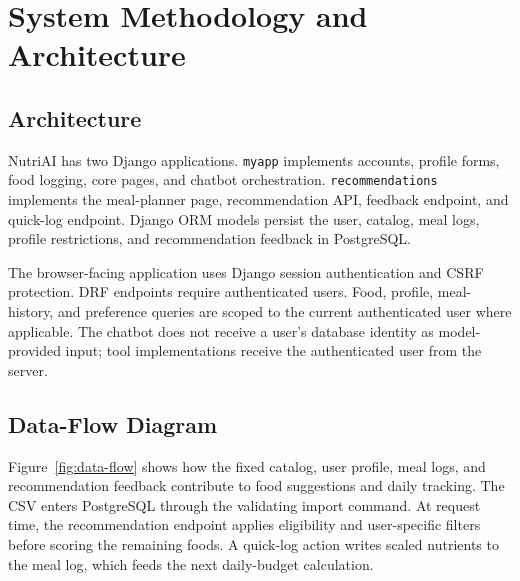 \documentclass[12pt,a4paper]{report}
\begin{document}
\chapter{System Methodology and Architecture}
\section{Architecture}
NutriAI has two Django applications. \texttt{myapp} implements accounts, profile forms,
food logging, core pages, and chatbot orchestration. \texttt{recommendations} implements
the meal-planner page, recommendation API, feedback endpoint, and quick-log endpoint.
Django ORM models persist the user, catalog, meal logs, profile restrictions, and
recommendation feedback in PostgreSQL.

\begin{center}
\end{center}

The browser-facing application uses Django session authentication and CSRF protection.
DRF endpoints require authenticated users. Food, profile, meal-history, and preference
queries are scoped to the current authenticated user where applicable. The chatbot does
not receive a user's database identity as model-provided input; tool implementations
receive the authenticated user from the server.

\section{Data-Flow Diagram}
Figure~\ref{fig:data-flow} shows how the fixed catalog, user profile, meal logs, and
recommendation feedback contribute to food suggestions and daily tracking. The CSV
enters PostgreSQL through the validating import command. At request time, the
recommendation endpoint applies eligibility and user-specific filters before scoring the
remaining foods. A quick-log action writes scaled nutrients to the meal log, which feeds
the next daily-budget calculation.
\end{document}

